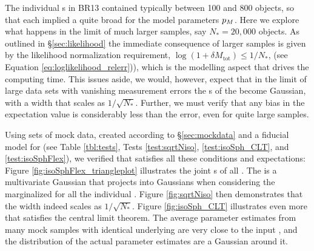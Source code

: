 The individual \MAP{}s in BR13 contained typically between 100 and 800 objects, so that each \MAP{} implied a quite broad \pdf{} for the model parameters $p_M{}$. Here we explore what happens in the limit of much larger samples, say $N_{*} = 20,000$ objects. As outlined in \S\ref{sec:likelihood} the immediate consequence of larger samples is given by the likelihood normalization requirement, $\log(1+\delta M_\text{tot})\le 1/N_{*}$, (see Equation \ref{eq:loglikelihood_relerr})), which is the modelling aspect that drives the computing time. This issues aside, we would, however, expect that in the limit of large data sets with vanishing measurement errors the \pdf{}s of the \pmodel{} become Gaussian, with a \pdf{} width that scales as $1/\sqrt{N_{*}}$. Further, we must verify that any bias in the \pdf{} expectation value is considerably less than the error, even for quite large samples.

Using sets of mock data, created according to \S\ref{sec:mockdata} and a fiducial model for \pmodel{} (see Table \ref{tbl:tests}, Tests \ref{test:sqrtNiso}, \ref{test:isoSph_CLT}, and \ref{test:isoSphFlex}), we verified that \RM{} satisfies all these conditions and expectations: Figure \ref{fig:isoSphFlex_triangleplot} illustrates the joint \pdf{}s of all \pmodel{}. The \pdf{} is a multivariate Gaussian that projects into Gaussians when considering the marginalized \pdf{} for all the individual \pmodel{}. Figure \ref{fig:sqrtNiso} then demonstrates that the \pdf{} width indeed scales as $1/\sqrt{N_{*}}$. Figure \ref{fig:isoSph_CLT} illustrates even more that \RM{} satisfies the central limit theorem. The average parameter estimates from many mock samples with identical underlying \pmodel{} are very close to the input \pmodel{}, and the distribution of the actual parameter estimates are a Gaussian around it. 

